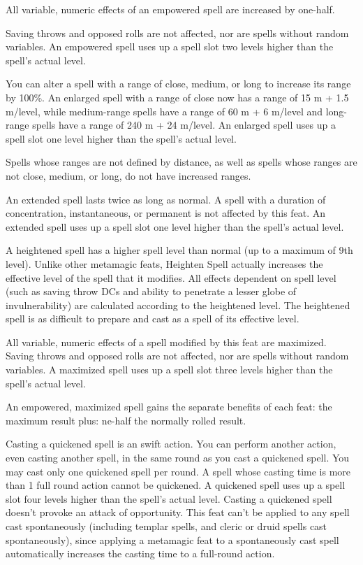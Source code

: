 
{All variable, numeric effects of an empowered spell are increased by one-half.

Saving throws and opposed rolls are not affected, nor are spells without random variables. An empowered spell uses up a spell slot two levels higher than the spell's actual level.}

{You can alter a spell with a range of close, medium, or long to increase its range by 100\%. An enlarged spell with a range of close now has a range of 15 m + 1.5 m/level, while medium-range spells have a range of 60 m + 6 m/level and long-range spells have a range of 240 m + 24 m/level. An enlarged spell uses up a spell slot one level higher than the spell's actual level.

Spells whose ranges are not defined by distance, as well as spells whose ranges are not close, medium, or long, do not have increased ranges.}

{An extended spell lasts twice as long as normal. A spell with a duration of concentration, instantaneous, or permanent is not affected by this feat. An extended spell uses up a spell slot one level higher than the spell's actual level.}

{A heightened spell has a higher spell level than normal (up to a maximum of 9th level). Unlike other metamagic feats, Heighten Spell actually increases the effective level of the spell that it modifies. All effects dependent on spell level (such as saving throw DCs and ability to penetrate a lesser globe of invulnerability) are calculated according to the heightened level. The heightened spell is as difficult to prepare and cast as a spell of its effective level.}

{All variable, numeric effects of a spell modified by this feat are maximized. Saving throws and opposed rolls are not affected, nor are spells without random variables. A maximized spell uses up a spell slot three levels higher than the spell's actual level.

An empowered, maximized spell gains the separate benefits of each feat: the maximum result plus:  ne-half the normally rolled result.}

{Casting a quickened spell is an swift action. You can perform another action, even casting another spell, in the same round as you cast a quickened spell. You may cast only one quickened spell per round. A spell whose casting time is more than 1 full round action cannot be quickened. A quickened spell uses up a spell slot four levels higher than the spell's actual level. Casting a quickened spell doesn't provoke an attack of opportunity.}
{}
{This feat can't be applied to any spell cast spontaneously (including templar spells, and cleric or druid spells cast spontaneously), since applying a metamagic feat to a spontaneously cast spell automatically increases the casting time to a full-round action.}

